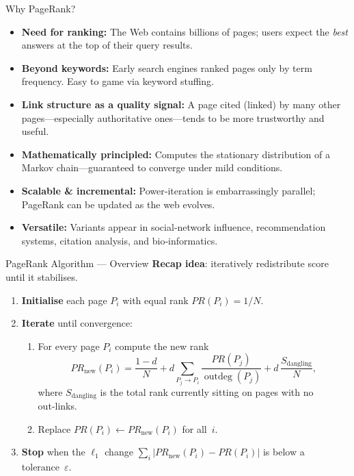 \documentclass{beamer}
\begin{document}
\begin{frame}{Why PageRank?}
\begin{itemize}
  \item \textbf{Need for ranking:} The Web contains billions of pages; users expect the \emph{best} answers at the top of their query results.
  \item \textbf{Beyond keywords:} Early search engines ranked pages only by term frequency. Easy to game via keyword stuffing.
  \item \textbf{Link structure as a quality signal:} A page cited (linked) by many other pages—especially authoritative ones—tends to be more trustworthy and useful.
  \item \textbf{Mathematically principled:} Computes the stationary distribution of a Markov chain—guaranteed to converge under mild conditions.
  \item \textbf{Scalable \& incremental:} Power‑iteration is embarrassingly parallel; PageRank can be updated as the web evolves.
  \item \textbf{Versatile:} Variants appear in social‑network influence, recommendation systems, citation analysis, and bio‑informatics.
\end{itemize}
\end{frame}

\begin{frame}[fragile]{PageRank Algorithm — Overview}
\textbf{Recap idea}: iteratively redistribute score until it stabilises.

\begin{enumerate}
  \item \textbf{Initialise} each page $P_i$ with equal rank $PR(P_i)=1/N$.
  \item \textbf{Iterate} until convergence:
    \begin{enumerate}
      \item For every page $P_i$ compute the new rank
      \[
        PR_{\text{new}}(P_i) = \frac{1-d}{N}
          + d \sum_{P_j \rightarrow P_i} \frac{PR(P_j)}{\operatorname{outdeg}(P_j)}
          + d\,\frac{S_{\text{dangling}}}{N},
      \]
      where $S_{\text{dangling}}$ is the total rank currently sitting on pages with no out‑links.
      \item Replace $PR(P_i) \leftarrow PR_{\text{new}}(P_i)$ for all~$i$.
    \end{enumerate}
  \item \textbf{Stop} when the $\ell_1$ change $\sum_i |PR_{\text{new}}(P_i)-PR(P_i)|$ is below a tolerance~$\varepsilon$.
\end{enumerate}
\end{frame}
\end{document}

